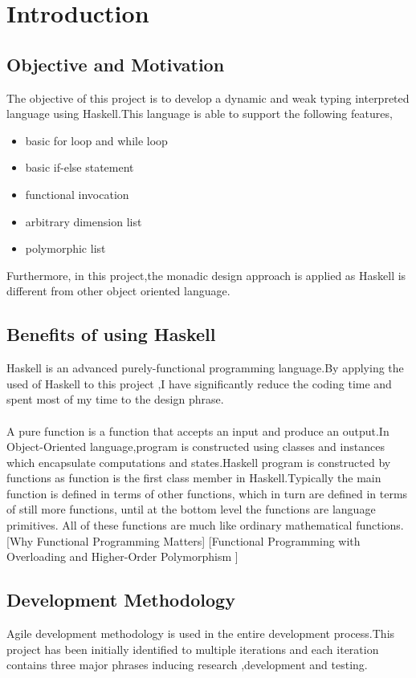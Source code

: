 \chapter{Introduction}
\section{Objective and Motivation}
The objective of this project is to develop a dynamic and weak typing interpreted language using Haskell.This language is able to support the following features,
\begin{itemize}
\item basic for loop and while loop
\item basic if-else statement
\item functional invocation 
\item arbitrary dimension list
\item polymorphic list
\end{itemize}

Furthermore, in this project,the monadic design approach is applied as Haskell is different from other object oriented language.

\section{Benefits of using Haskell} 
Haskell is an advanced purely-functional programming language.By applying the used of Haskell to this project ,I have significantly reduce the coding time and spent most of my time to the design phrase.
\\
\\
A pure function is a function that accepts an input and produce an output.In Object-Oriented language,program is constructed using classes and instances which encapsulate computations and states.Haskell program is constructed by functions as function is the first class member in Haskell.Typically the main function is defined in terms of other functions, which in turn are defined in terms of still more functions, until at the bottom level the functions are language primitives. All of these functions are much like ordinary mathematical functions.
[Why Functional Programming Matters]
[Functional Programming with Overloading and
Higher-Order Polymorphism
]
\section{Development Methodology}
Agile development methodology is used in the entire development process.This project has been initially identified to multiple iterations and each iteration contains three major phrases inducing research ,development and testing.
